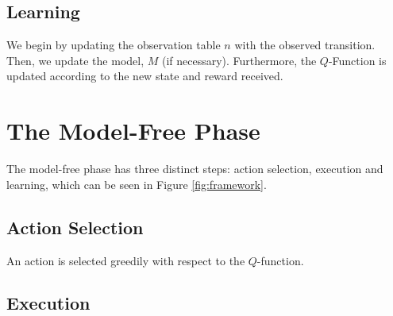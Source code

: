 \subsection{Learning}
We begin by updating the observation table $n$ with the observed transition. Then, we update the model, $M$ (if necessary). Furthermore, the $Q$-Function is updated according to the new state and reward received.
\section{The Model-Free Phase}
The model-free phase has three distinct steps: action selection, execution and learning, which can be seen in Figure \ref{fig:framework}.
\subsection{Action Selection}
An action is selected greedily with respect to the $Q$-function.
\subsection{Execution}
